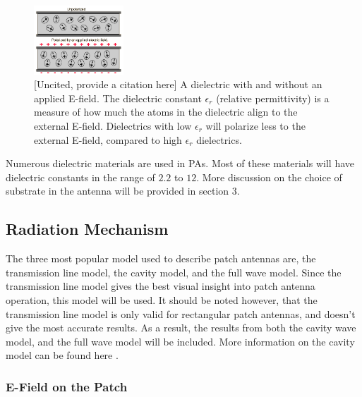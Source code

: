 \documentclass[12pt]{article}
\begin{document}
\begin{figure}[h]
    \centering
    \includegraphics[width=0.3\textwidth]{dielectric.png}
    \caption{ [Uncited, provide a citation here] A dielectric with and without an applied E-field. The dielectric constant $\epsilon_r$ (relative permittivity) is a measure of how much the atoms in the dielectric align to the external E-field. Dielectrics with low $\epsilon_r$ will polarize less to the external E-field, compared to high $\epsilon_r$ dielectrics.}
\end{figure}

Numerous dielectric materials are used in PAs. Most of these materials will have dielectric constants in the range of $2.2$ to $12$\cite{balanis2016antenna}. More discussion on the choice of substrate in the antenna will be provided in section 3. 
\subsection{Radiation Mechanism}

The three most popular model used to describe patch antennas are, the transmission line model, the cavity model, and the full wave model\cite{balanis2016antenna}. Since the transmission line model gives the best visual insight\cite{balanis2016antenna} into patch antenna operation, this model will be used. It should be noted however, that the transmission line model is only valid for rectangular patch antennas, and doesn't give the most accurate results\cite{balanis2016antenna}. As a result, the results from both the cavity wave model, and the full wave model will be included. More information on the cavity model can be found here \cite{balanis2016antenna}. 

\subsubsection{E-Field on the Patch}
 
\end{document}
